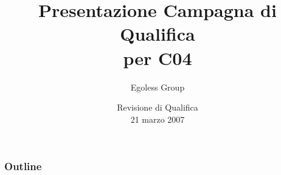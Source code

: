 



\title{Presentazione Campagna di Qualifica \\ per C04}

\author{Egoless Group}

\date[RQ 21/03/2007] %
{Revisione di Qualifica \\ 21 marzo 2007}

\subject{Presentazione della definizione di prodotto per il capitolato C04}








\begin{frame}
  \titlepage
\end{frame}

\begin{frame}
  \frametitle{Outline}
  \tableofcontents
\end{frame}




